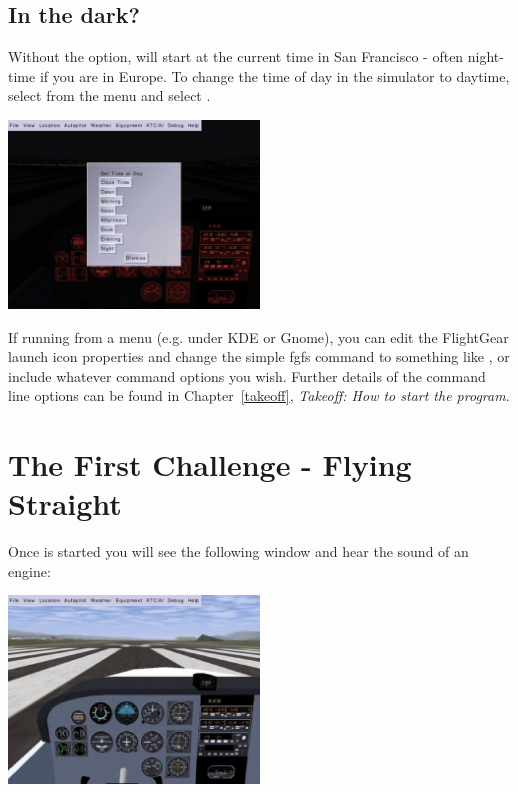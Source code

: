 \subsection{In the dark?}

Without the  option, \FlightGear{} will start at the 
current time in San Francisco - often night-time if you are in Europe. To 
change the time of day in the simulator to daytime, select
 from the menu and select .

\begin{center}
\includegraphics[width=0.5\textwidth]{img/tut_5}
\end{center}

If running \FlightGear{} from a menu (e.g. under KDE or Gnome), you can edit the
FlightGear launch icon properties and change the simple  fgfs 
command to something like ,
or include whatever command options you wish. Further details of the command
line options can be found in Chapter~\ref{takeoff}, 
\textit{Takeoff: How to start the program}.

\section{The First Challenge - Flying Straight}
\label{sec:FlyingStraight}
    
Once \FlightGear{} is started you will see the following window and hear the 
sound of an engine:

\begin{center}
\includegraphics[width=0.5\textwidth]{img/tut_6}
\end{center}


